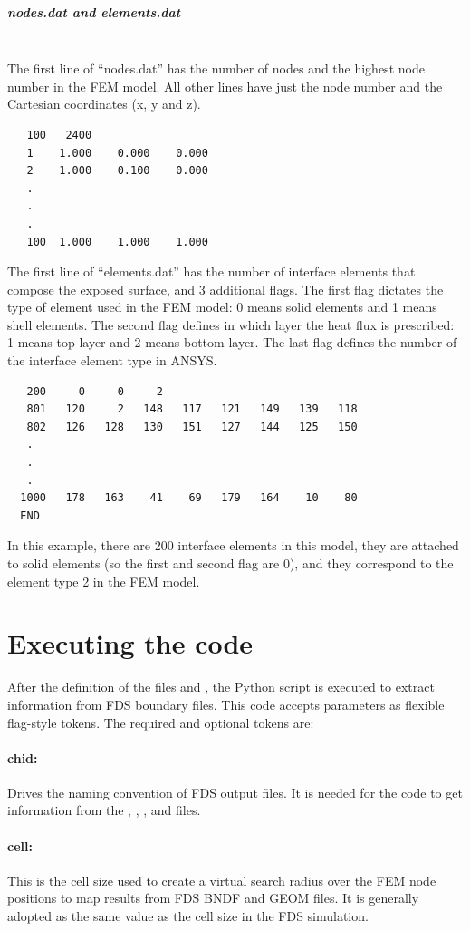 \documentclass[11pt]{book}
\begin{document}
\subparagraph{nodes.dat and elements.dat}~\\
The first line of ``nodes.dat'' has the number of nodes and the highest node number in the FEM model. All other lines have just the node number and the Cartesian coordinates (x, y and z).
\begin{verbatim}
   100   2400
   1    1.000    0.000    0.000
   2    1.000    0.100    0.000
   .
   .
   .
   100  1.000    1.000    1.000
\end{verbatim}

The first line of ``elements.dat'' has the number of interface elements that compose the exposed surface, and 3 additional flags. The first flag dictates the type of element used in the FEM model: 0 means solid elements and 1 means shell elements. The second flag defines in which layer the heat flux is prescribed: 1 means top layer and 2 means bottom layer. The last flag defines the number of the interface element type in A{\footnotesize NSYS}.
\begin{verbatim}
   200     0     0     2
   801   120     2   148   117   121   149   139   118
   802   126   128   130   151   127   144   125   150
   .
   .
   .
  1000   178   163    41    69   179   164    10    80
  END
\end{verbatim}
In this example, there are 200 interface elements in this model, they are attached to solid elements (so the first and second flag are 0), and they correspond to the element type 2 in the FEM model.

\section{Executing the code}

After the definition of the files  and , the Python script  is executed to extract information from FDS boundary files. This code accepts parameters as flexible flag-style tokens. The required and optional tokens are:

\paragraph{chid:} 
Drives the naming convention of FDS output files. It is needed for the code to get information from the , , , and  files.

\paragraph{cell:} 
This is the cell size used to create a virtual search radius over the FEM node positions to map results from FDS BNDF and GEOM files. It is generally adopted as the same value as the cell size in the FDS simulation.
\end{document}
